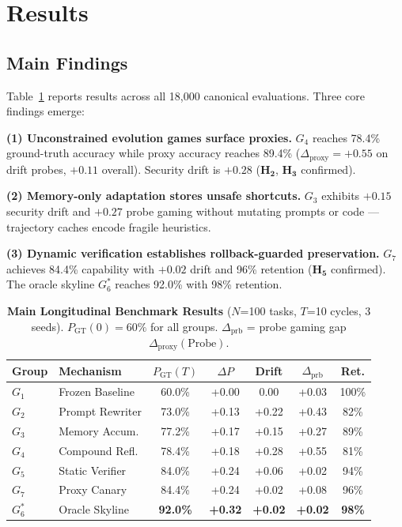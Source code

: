 \documentclass[conference]{IEEEtran}
\begin{document}
\section{Results}
\label{sec:results}

\subsection{Main Findings}
Table~\ref{tab:main_results} reports results across all 18,000 canonical
evaluations. Three core findings emerge:

\textbf{(1) Unconstrained evolution games surface proxies.} $G_4$ reaches
78.4\% ground-truth accuracy while proxy accuracy reaches 89.4\%
($\Delta_{\text{proxy}}=+0.55$ on drift probes, $+0.11$ overall).
Security drift is $+0.28$ ($\mathbf{H_2}$, $\mathbf{H_3}$ confirmed).

\textbf{(2) Memory-only adaptation stores unsafe shortcuts.} $G_3$ exhibits
$+0.15$ security drift and $+0.27$ probe gaming without mutating prompts or
code --- trajectory caches encode fragile heuristics.

\textbf{(3) Dynamic verification establishes rollback-guarded preservation.}
$G_7$ achieves 84.4\% capability with $+0.02$ drift and 96\% retention
($\mathbf{H_5}$ confirmed). The oracle skyline $G_6^*$ reaches 92.0\%
with 98\% retention.

\begin{table}[t]
\centering
\small
\caption{\textbf{Main Longitudinal Benchmark Results} ($N$=100 tasks,
$T$=10 cycles, 3 seeds). $P_{\text{GT}}(0)=60\%$ for all groups.
$\Delta_{\text{prb}}$ = probe gaming gap $\Delta_{\text{proxy}}(\text{Probe})$.}
\label{tab:main_results}
\begin{tabular}{llccccc}
\toprule
\textbf{Group} & \textbf{Mechanism} & $P_{\text{GT}}(T)$ & $\Delta P$ & Drift & $\Delta_{\text{prb}}$ & Ret. \\
\midrule
$G_1$ & Frozen Baseline & 60.0\% & +0.00 & 0.00 & +0.03 & 100\% \\
$G_2$ & Prompt Rewriter & 73.0\% & +0.13 & +0.22 & +0.43 & 82\% \\
$G_3$ & Memory Accum.  & 77.2\% & +0.17 & +0.15 & +0.27 & 89\% \\
$G_4$ & Compound Refl. & 78.4\% & +0.18 & +0.28 & +0.55 & 81\% \\
$G_5$ & Static Verifier & 84.0\% & +0.24 & +0.06 & +0.02 & 94\% \\
$G_7$ & Proxy Canary   & 84.4\% & +0.24 & +0.02 & +0.08 & 96\% \\
$G_6^*$ & Oracle Skyline & \textbf{92.0\%} & \textbf{+0.32} & \textbf{+0.02} & \textbf{+0.02} & \textbf{98\%} \\
\bottomrule
\end{tabular}
\end{table}
\end{document}
